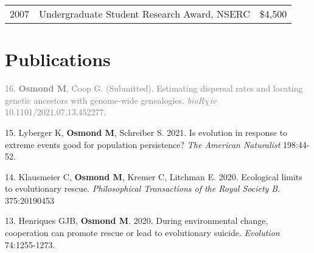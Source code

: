 \documentclass[12pt]{article}
\begin{document}
\begin{tabular}{llr}
  2007 & Undergraduate Student Research Award, NSERC & \$4,500\\
\end{tabular}

\newpage
\section*{Publications}

\noindent\hspace{.1cm}\textcolor{gray}{16. \textbf{Osmond M}, Coop G. (Submitted). Estimating dispersal rates and locating genetic ancestors with genome-wide genealogies. \textit{bioR$\chi$iv} 10.1101/2021.07.13.452277.}

\noindent\hspace{.1cm}15. Lyberger K, \textbf{Osmond M}, Schreiber S. 2021. Is evolution in response to extreme events good for population persistence? \textit{The American Naturalist} 198:44-52.

\noindent\hspace{.1cm}14. Klausmeier C, \textbf{Osmond M}, Kremer C, Litchman E. 2020. Ecological limits to evolutionary rescue. \textit{Philosophical Transactions of the Royal Society B}. 375:20190453

\noindent\hspace{.1cm}13. Henriques GJB, \textbf{Osmond M}. 2020. During environmental change, cooperation can promote rescue or lead to evolutionary suicide. \textit{Evolution} 74:1255-1273.
\end{document}
